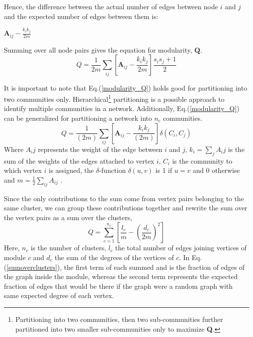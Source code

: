 Hence, the difference between the actual number of edges between node $i$ and $j$ and the expected number of edges between them is:

\begin{center}
	$\textbf{A}_{ij} - \frac{k_i k_j}{2m}$
\end{center}

Summing over all node pairs gives the equation for modularity, $\textbf{Q}$.
\begin{equation}\label{modularity_Q}
Q = \dfrac{1}{2m} \sum\limits_{ij}\left[\textbf{A}_{ij} - \dfrac{k_i k_j}{2m}\right] \dfrac{s_i s_j + 1}{2}
\end{equation}

It is important to note that Eq.(\ref{modularity_Q}) holds good for partitioning into two communities only. Hierarchical\footnote{Partitioning into two communities, then two sub-communities further partitioned into two smaller sub-communities only to maximize \textbf{Q}.} partitioning is a possible approach to identify multiple communities in a network. Additionally, Eq.(\ref{modularity_Q}) can be generalized for partitioning a network into $n_c$ communities.
\begin{equation}
Q = \dfrac{1}{(2m)} \sum\limits_{ij}\left[\textbf{A}_{ij} - \dfrac{k_i k_j}{(2m)}\right] \delta(C_i, C_j)
\end{equation}
Where $A_ij$ represents the weight of the edge between $i$ and $j$, $k_i = \sum_j A_ij$ is the sum of the weights of the edges attached to vertex $i$, $C_i$ is the community to which vertex $i$ is assigned, the $\delta$-function $\delta(u,v)$ is 1 if $u = v$ and 0 otherwise and $m = \frac{1}{2} \sum_{ij}A_{ij}$ \cite{ref-27}.
 
Since the only contributions to the sum come from vertex pairs belonging to the same cluster, we can group these contributions together and rewrite the sum over the vertex pairs as a sum over the clusters,
\begin{equation}\label{sumoverclusters}
Q = \sum\limits_{c=1}^{n_c} \left[ \dfrac{l_c}{m} - \left( \dfrac{d_c}{2m}\right)^2\right]
\end{equation}
Here, $n_c$ is the number of clusters, $l_c$ the total number of edges joining vertices of module $c$ and $d_c$ the sum of the degrees of the vertices of $c$. In Eq.(\ref{sumoverclusters}), the first term of each summed and is the fraction of edges of the graph inside the module, whereas the second term represents the expected fraction of edges that would be there if the graph were a random graph with same expected degree of each vertex.

